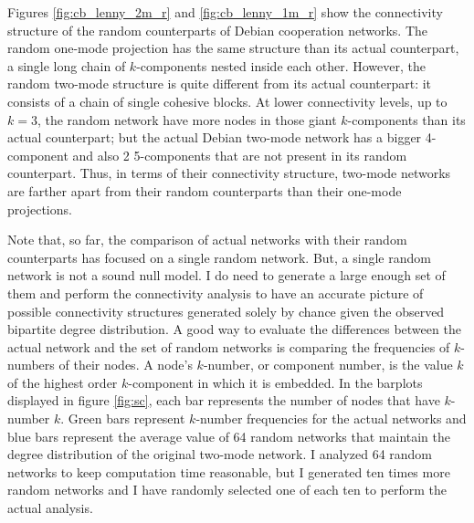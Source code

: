 Figures \ref{fig:cb_lenny_2m_r} and \ref{fig:cb_lenny_1m_r} show the connectivity structure of the random counterparts of Debian cooperation networks. The random one-mode projection has the same structure than its actual counterpart, a single long chain of $k$-components nested inside each other. However, the random two-mode structure is quite different from its actual counterpart: it consists of a chain of single cohesive blocks. At lower connectivity levels, up to $k=3$, the random network have more nodes in those giant $k$-components than its actual counterpart; but the actual Debian two-mode network has a bigger 4-component and also 2 5-components that are not present in its random counterpart. Thus, in terms of their connectivity structure, two-mode networks are farther apart from their random counterparts than their one-mode projections.

Note that, so far, the comparison of actual networks with their random counterparts has focused on a single random network. But, a single random network is not a sound null model. I do need to generate a large enough set of them and perform the connectivity analysis to have an accurate picture of possible connectivity structures generated solely by chance given the observed bipartite degree distribution. A good way to evaluate the differences between the actual network and the set of random networks is comparing the frequencies of $k$-numbers of their nodes. A node's $k$-number, or component number, is the value $k$ of the highest order $k$-component in which it is embedded. In the barplots displayed in figure \ref{fig:sc}, each bar represents the number of nodes that have $k$-number $k$. Green bars represent $k$-number frequencies for the actual networks and blue bars represent the average value of 64 random networks that maintain the degree distribution of the original two-mode network. I analyzed 64 random networks to keep computation time reasonable, but I generated ten times more random networks and I have randomly selected one of each ten to perform the actual analysis.

